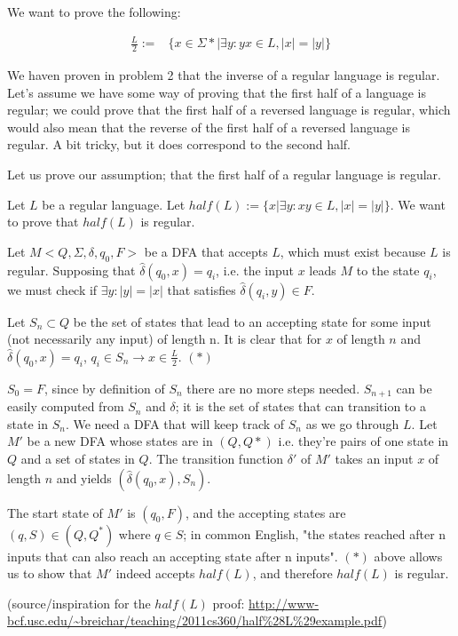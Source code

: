 
We want to prove the following:

\begin{align*}
\frac {L}{2} :=& \{x \in \Sigma * | \exists y : yx \in L, |x| = |y| \}
\end{align*}

We haven proven in problem 2 that the inverse of a regular language is regular. Let's assume we have some way of proving that the first half of a language is regular; we could prove that the first half of a reversed language is regular, which would also mean that the reverse of the first half of a reversed language is regular. A bit tricky, but it does correspond to the second half.

Let us prove our assumption; that the first half of a regular language is regular.


Let $L$ be a regular language. Let $half(L) := \{ x | \exists y : xy \in L, |x| = |y| \}$. We want to prove that $half(L)$ is regular.

Let $M < Q, \Sigma, \delta, q_0, F>$ be a DFA that accepts $L$, which must exist because $L$ is regular. Supposing that $\hat \delta (q_0, x) = q_i$, i.e. the input $x$ leads $M$ to the state $q_i$, we must check if $\exists y : |y| = |x|$ that satisfies $\hat \delta (q_i, y) \in F$. 

Let $S_n \subset Q$ be the set of states that lead to an accepting state for some input (not necessarily any input) of length n. 
It is clear that for $x$ of length $n$ and $\hat \delta(q_0, x) = q_i$, $q_i \in S_n \rightarrow x \in \frac L 2$.  $(*)$ \newline

$S_0 = F$, since by definition of $S_n$ there are no more steps needed. $S_{n+1}$ can be easily computed from $S_n$ and $\delta$; it is the set of states that can transition to a state in $S_n$.
We need a DFA that will keep track of $S_n$ as we go through $L$. Let $M'$ be a new DFA whose states are in $(Q, Q*)$ i.e. they're pairs of one state in $Q$ and a set of states in $Q$. The transition function $\delta'$ of $M'$ takes an input $x$ of length $n$ and yields $(\hat \delta(q_0, x), S_n)$. \newline

The start state of $M'$ is $(q_0, F)$, and the accepting states are $(q, S) \in (Q, Q^*)$ where $q \in S$; in common English, "the states reached after n inputs that can also reach an accepting state after n inputs". \newline
$(*)$ above allows us to show that $M'$ indeed accepts $half(L)$, and therefore $half(L)$ is regular.

(source/inspiration for the $half(L)$ proof: \url{http://www-bcf.usc.edu/~breichar/teaching/2011cs360/half\%28L\%29example.pdf})
